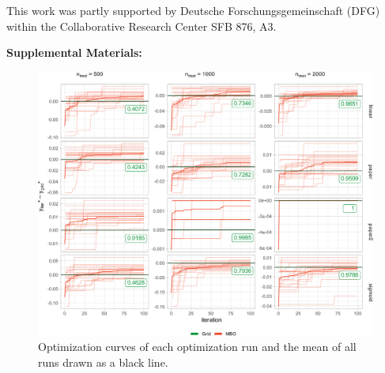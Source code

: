 \documentclass[bimj,fleqn]{w-art}
\theoremstyle{plain}
\theoremstyle{definition}
\begin{document}
\begin{acknowledgement}
This work was partly supported by Deutsche Forschungsgemeinschaft (DFG) within the Collaborative Research Center SFB 876, A3.
\end{acknowledgement}
\vspace*{1pc}










\newpage
\phantom{aaaa}
\clearpage
\begin{center}
\textbf{\large Supplemental Materials: \newtitle}
\end{center}
\FloatBarrier
\setcounter{equation}{0}
\setcounter{figure}{0}
\setcounter{table}{0}
\setcounter{page}{1}
\makeatletter
\renewcommand{\theequation}{S\arabic{equation}}
\renewcommand{\thefigure}{S\arabic{figure}}
\renewcommand{\thetable}{S\arabic{table}}
\renewcommand{\bibnumfmt}[1]{[S#1]}



\begin{figure}[htb]
\centering
\includegraphics[width=\linewidth]{generated/figures/plot_opt_path.pdf}
\caption{%
  Optimization curves of each optimization run and the mean of all runs drawn as a black line.
  }
\label{fig:plot_opt_path} 
\end{figure}
\end{document}
